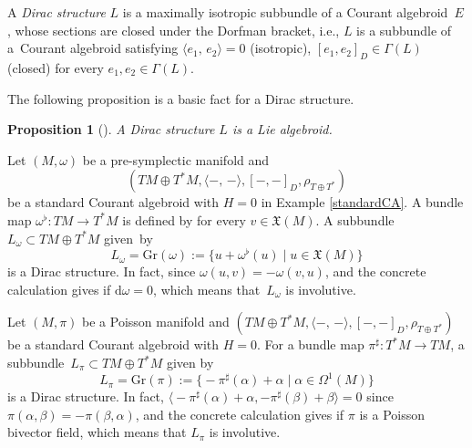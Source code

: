 \documentclass[10pt,a4paper]{amsart}
\numberwithin{equation}{section}
\newtheorem{Proposition}[Theorem]{Proposition}
 { \theoremstyle{definition}
\newtheorem{Definition}[Theorem]{Definition}
\newtheorem{Note}[Theorem]{Note}
\newtheorem{Example}[Theorem]{Example}
\newtheorem{Remark}[Theorem]{Remark}
\newtheorem{Question}[Theorem]{Question}
 }
\newcommand{\courant}[2]{{[{{#1},{#2}}]_D}}
\newcommand{\rhott}{\rho_{T \oplus T^*}}
\newcommand{\bracket}[2]{\langle #1,\,#2\rangle}
\newcommand{\rd}{\mathrm{d}}
\begin{document}
\begin{Definition}
A \emph{Dirac structure} $L$ is a
maximally isotropic subbundle of a Courant algebroid~$E$,
whose sections are closed under the Dorfman bracket,
i.e., $L$ is a subbundle of a~Courant algebroid satisfying
$
\bracket{e_1}{e_2}=0$ (isotropic),
$
 \courant{e_1}{e_2} \in \Gamma(L)$ (closed)
for every $e_1, e_2 \in \Gamma(L)$.
\end{Definition}

The following proposition is a basic fact for a Dirac structure.
\begin{Proposition}[\cite{LWX}]
A Dirac structure $L$ is a Lie algebroid.
\end{Proposition}

\begin{Example}\label{symplecticdirac}
Let $(M, \omega)$ be a pre-symplectic manifold and
\[(TM \oplus T^*M, \bracket{-}{-}, \courant{-}{-}, \allowbreak\rhott)\]
 be a
standard Courant algebroid with $H=0$ in Example \ref{standardCA}.
A bundle map $\omega^{\flat}\colon TM \rightarrow T^*M$ is defined
by  for every $v \in \mathfrak{X}(M)$.
A subbundle $L_{\omega} \subset TM \oplus T^*M$ given~by
\[
L_{\omega} = \mathrm{Gr}(\omega) := \bigl\{ u + \omega^{\flat}(u) \mid u \in \mathfrak{X}(M) \bigr\}\]
is a Dirac structure.
In fact,
since $\omega(u, v) = - \omega(v, u)$,
and the concrete calculation gives
 if $\rd \omega =0$, which means that~$L_{\omega}$ is involutive.
\end{Example}

\begin{Example}\label{Poissondirac}
Let $(M, \pi)$ be a Poisson manifold and
$(TM \oplus T^*M, \bracket{-}{-}, \courant{-}{-}, \rhott)$ be a
standard Courant algebroid with $H=0$.
For a bundle map $\pi^{\sharp}\colon T^*M \rightarrow TM$,
a subbundle~${L_{\pi} \subset TM \oplus T^*M}$ given by
\[%
L_{\pi} = \mathrm{Gr}(\pi) := \bigl\{ -\pi^{\sharp}(\alpha) + \alpha \mid \alpha \in \Omega^1(M) \bigr\}
\]
is a Dirac structure.
In fact,
$\bigl\langle-\pi^{\sharp}(\alpha) + \alpha,-\pi^{\sharp}(\beta) + \beta\bigr\rangle=0$
since $\pi(\alpha, \beta) = - \pi(\beta, \alpha)$,
and the concrete calculation gives
\smash{$
\bigl[-\pi^{\sharp}(\alpha) + \alpha,-\pi^{\sharp}(\beta) + \beta\bigr]
= -\pi^{\sharp}([\alpha, \beta]_{\pi}) + [\alpha, \beta]_{\pi}$}
if $\pi$ is a Poisson bivector field, which means that $L_{\pi}$ is involutive.
\end{Example}
\end{document}
